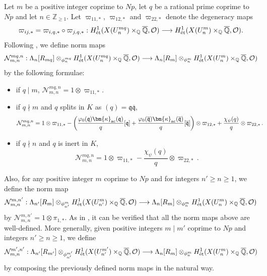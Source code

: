 \documentclass{amsart}
\numberwithin{equation}{section}
\newcommand{\bb}{\mathbb}
\newcommand{\frk}{\mathfrak}
\newcommand{\ac}{\textup{ac}}
\newcommand{\etale}{\textup{\'et}}
\begin{document}
Let $m$ be a positive integer coprime to $Np$, let $q$ be a rational prime coprime to $Np$ and let $n\in \bb{Z}_{\geq 1}$. Let $\varpi_{11,\ast}$, $\varpi_{12,\ast}$ and $\varpi_{22,\ast}$ denote the degeneracy maps
\[
\varpi_{ij,\ast}=\varpi_{i,q,\ast}\circ \varpi_{j,q,\ast}: H^1_{\etale}(X(U_n^{mq})\times_\bb{Q}\overline{\bb{Q}},\mathcal{O}) \longrightarrow H^1_{\etale}(X(U_n^{m})\times_\bb{Q}\overline{\bb{Q}},\mathcal{O}).
\]
Following \cite[\S~3.3]{LLZ2}, we define norm maps
\[
\mathcal{N}_{m,n}^{mq,n}:\Lambda_n[R_{mq}]\otimes_{\phi_{n}^{mq}} H^1_{\etale}(X(U_n^{mq})\times_\bb{Q}\overline{\bb{Q}},\mathcal{O})\longrightarrow \Lambda_n[R_{m}]\otimes_{\phi_n^{m}} H^1_{\etale}(X(U_n^{m})\times_\bb{Q}\overline{\bb{Q}},\mathcal{O})
\]
by the following formulae:
\begin{itemize}
    \item if $q\mid m$, $\mathcal{N}_{m,n}^{mq,n}=1\otimes \varpi_{11,\ast}$.
    \item if $q\nmid m$ and $q$ splits in $K$ as $(q)=\frk{q}\overline{\frk{q}}$,
    \begin{align*}
    \mathcal{N}_{m,n}^{mq,n}&=1\otimes \varpi_{11,\ast}-\left(\frac{\varphi_{0}(\frk{q})\bm{\kappa}_{\ac}(\frk{q})}{q}[\frk{q}]+\frac{\varphi_{0}(\overline{\frk{q}})\bm{\kappa}_{\ac}(\overline{\frk{q}})}{q}[\overline{\frk{q}}]\right)\otimes \varpi_{12,\ast}+\frac{\chi_\psi(q)}{q}\otimes \varpi_{22,\ast}\,.
    \end{align*}
    \item if $q\nmid n$ and $q$ is inert in $K$,
    \[
    \mathcal{N}_{m,n}^{mq,n}=1\otimes \varpi_{11,\ast}-\frac{\chi_\psi(q)}{q}\otimes \varpi_{22,\ast}\,.
    \]
\end{itemize}

Also, for any positive integer $m$ coprime to $N p$ and for integers $n'\geq n\geq 1$, we define the norm map
\[
\mathcal{N}_{m,n}^{m,n'}:\Lambda_{n'}[R_{m}]\otimes_{\phi_{n'}^{m}} H^1_{\etale}(X(U_{n'}^{m})\times_\bb{Q}\overline{\bb{Q}},\mathcal{O})\longrightarrow \Lambda_n[R_{m}]\otimes_{\phi_n^{m}} H^1_{\etale}(X(U_n^{m})\times_\bb{Q}\overline{\bb{Q}},\mathcal{O})
\]
by $\mathcal{N}_{m,n}^{m,n'}=1\otimes \pi_{1,\ast}$. As in \cite[Prop.~3.3.2]{LLZ2}, it can be verified that all the norm maps above are well-defined. More generally, given positive integers $m\mid m'$ coprime to $Np$ and integers $n'\geq n\geq 1$, we define
\[
\mathcal{N}_{m,n}^{m',n'}:\Lambda_{n'}[R_{m'}]\otimes_{\phi_{n'}^{m'}} H^1_{\etale}(X(U_{n'}^{m'})\times_\bb{Q}\overline{\bb{Q}},\mathcal{O})\longrightarrow \Lambda_n[R_{m}]\otimes_{\phi_n^{m}} H^1_{\etale}(X(U_n^{m})\times_\bb{Q}\overline{\bb{Q}},\mathcal{O})
\]
by composing the previously defined norm maps in the natural way.
\end{document}
